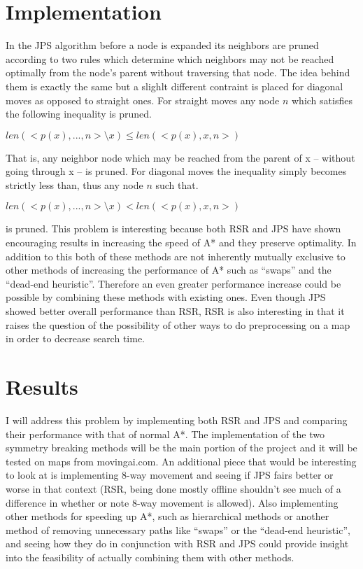 \documentclass[12pt]{article}
\begin{document}
\section{Implementation}
In the JPS algorithm before a node is expanded its neighbors are pruned according to two rules which determine which neighbors may not be reached
optimally from the node's parent without traversing that node. The idea behind them is exactly the same but a slighlt different contraint is placed
for diagonal moves as opposed to straight ones. For straight moves any node $n$ which satisfies the following inequality is pruned.

$len( <p(x),...,n> \setminus x ) \le len( <p(x),x,n> )$

That is, any neighbor node which may be reached from the parent of x -- without going through x -- is pruned. For diagonal moves the inequality simply
becomes strictly less than, thus any node $n$ such that.

$len( <p(x),...,n> \setminus x ) < len( <p(x),x,n> )$

is pruned.
This problem is interesting because both RSR and JPS have shown encouraging results in increasing the speed of A* and they preserve optimality. In addition to
this both of these methods are not inherently mutually exclusive to other methods of increasing the performance of A* such as ``swaps''  and the ``dead-end
heuristic''\cite{Har2010,Har2011}.  Therefore an even greater performance increase could be possible by combining these methods with existing ones. 
Even though JPS showed better overall performance than RSR, RSR is also interesting in that it raises the question of the possibility of other ways to do 
preprocessing on a map in order to decrease search time. 

\section{Results}
I will address this problem by implementing both RSR and JPS and comparing their performance with that of normal A*. The implementation of the two symmetry
breaking methods will be the main portion of the project and it will be tested on maps from movingai.com. An additional piece that would be interesting to 
look at is implementing 8-way movement and seeing if JPS fairs better or worse in that context (RSR, being done mostly offline shouldn't see much of a 
difference in whether or note 8-way movement is allowed). Also implementing other methods for speeding up A*, such as hierarchical methods or another method of
removing unnecessary paths like ``swaps'' or the ``dead-end heuristic'', and seeing how they do in conjunction with RSR and JPS could provide insight into 
the feasibility of actually combining them with other methods.
\end{document}
